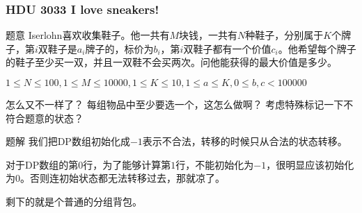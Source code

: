 \documentclass[UTF-8,aspectratio=1610]{ctexbeamer}
\begin{document}
\begin{frame}
\frametitle{HDU 3033 I love sneakers!}
\begin{block}{题意}
Iserlohn喜欢收集鞋子。他一共有$M$块钱，一共有$N$种鞋子，分别属于$K$个牌子，第$i$双鞋子是$a_i$牌子的，标价为$b_i$，第$i$双鞋子都有一个价值$c_i$。他希望每个牌子的鞋子至少买一双，并且一双鞋不会买两次。问他能获得的最大价值是多少。

$1\leqslant N\leqslant 100,1\leqslant M\leqslant10000,1\leqslant K\leqslant10,1\leqslant a\leqslant K,0\leqslant b,c<100000$
\end{block}
\pause
\begin{alertblock}{怎么又不一样了？}
每组物品中至少要选一个，这怎么做啊？
\pause
考虑特殊标记一下不符合题意的状态？
\end{alertblock}
\pause
\begin{exampleblock}{题解}
我们把DP数组初始化成$-1$表示不合法，转移的时候只从合法的状态转移。\pause

对于DP数组的第$0$行，为了能够计算第$1$行，不能初始化为$-1$，很明显应该初始化为$0$。否则连初始状态都无法转移过去，那就凉了。\pause

剩下的就是个普通的分组背包。
\end{exampleblock}
\end{frame}
\end{document}
